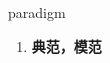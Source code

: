 
\begin{frame}
{\huge paradigm}
\begin{center}
\begin{enumerate}\Large
  \item \textbf{典范，模范}
\end{enumerate}
\end{center}
\end{frame}
